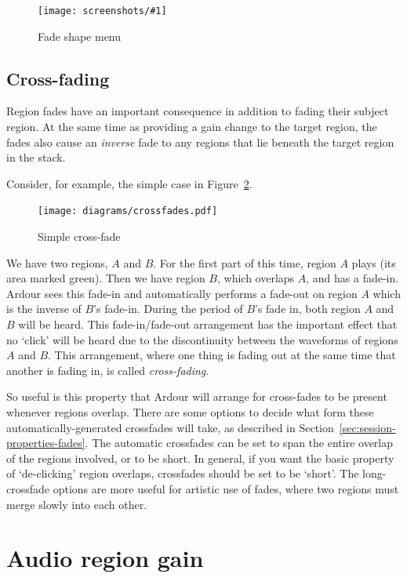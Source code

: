\documentclass[10pt,a4paper]{book}
\newcommand{\screenshot}[3]{%
\begin{figure}[ht]%
\begin{center}
\texttt{[image: screenshots/\#1]}
\end{center}
\caption{#2}
\label{#3}
\end{figure}}
\begin{document}
\screenshot{fades-menu.png}{Fade shape menu}{fig:fades-menu}


\subsection{Cross-fading}

Region fades have an important consequence in addition to fading their
subject region.  At the same time as providing a gain change to the
target region, the fades also cause an \emph{inverse} fade to any
regions that lie beneath the target region in the stack.

Consider, for example, the simple case in Figure~\ref{fig:crossfades}.

\begin{figure}[ht]
\begin{center}
\texttt{[image: diagrams/crossfades.pdf]}
\end{center}
\caption{Simple cross-fade}
\label{fig:crossfades}
\end{figure}

We have two regions, $A$ and $B$.  For the first part of this time,
region $A$ plays (its area marked green).  Then we have region $B$,
which overlaps $A$, and has a fade-in.  Ardour sees this fade-in and
automatically performs a fade-out on region $A$ which is the inverse
of $B$'s fade-in.  During the period of $B$'s fade in, both region $A$
and $B$ will be heard.  This fade-in/fade-out arrangement has the
important effect that no `click' will be heard due to the
discontinuity between the waveforms of regions $A$ and $B$.  This
arrangement, where one thing is fading out at the same time that
another is fading in, is called \emph{cross-fading}.

So useful is this property that Ardour will arrange for cross-fades to
be present whenever regions overlap.  There are some options to decide
what form these automatically-generated crossfades will take, as
described in Section~\ref{sec:session-properties-fades}.  The
automatic crossfades can be set to span the entire overlap of the
regions involved, or to be short.  In general, if you want the basic
property of `de-clicking' region overlaps, crossfades should be set to be
`short'.  The long-crossfade options are more useful for
artistic use of fades, where two regions must merge slowly into each
other.



\section{Audio region gain}
\label{sec:audio-region-gain}
\end{document}
